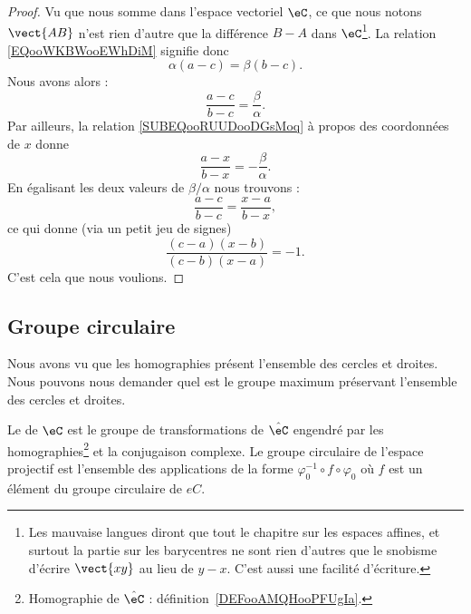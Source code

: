\begin{proof}
	Vu que nous somme dans l'espace vectoriel \( \eC\), ce que nous notons \( \vect{ AB }\) n'est rien d'autre que la différence \( B-A\) dans \( \eC\)\footnote{Les mauvaise langues diront que tout le chapitre sur les espaces affines, et surtout la partie sur les barycentres ne sont rien d'autres que le snobisme d'écrire \( \vect{ xy }\) au lieu de \( y-x\). C'est aussi une facilité d'écriture.}. La relation \eqref{EQooWKBWooEWhDiM} signifie donc
	\begin{equation}
		\alpha(a-c)=\beta(b-c).
	\end{equation}
	Nous avons alors :
	\begin{equation}
		\frac{ a-c }{ b-c }=\frac{ \beta }{ \alpha }.
	\end{equation}
	Par ailleurs, la relation \eqref{SUBEQooRUUDooDGsMoq} à propos des coordonnées de \( x\) donne
	\begin{equation}
		\frac{ a-x }{ b-x }=-\frac{ \beta }{ \alpha }.
	\end{equation}
	En égalisant les deux valeurs de \( \beta/\alpha\) nous trouvons :
	\begin{equation}
		\frac{ a-c }{ b-c }=\frac{ x-a }{ b-x },
	\end{equation}
	ce qui donne (via un petit jeu de signes)
	\begin{equation}
		\frac{ (c-a)(x-b) }{ (c-b)(x-a) }=-1.
	\end{equation}
	C'est cela que nous voulions.
\end{proof}

\subsection{Groupe circulaire}

Nous avons vu que les homographies présent l'ensemble des cercles et droites. Nous pouvons nous demander quel est le groupe maximum préservant l'ensemble des cercles et droites.

\begin{definition}
	Le  de \( \eC\) est le groupe de transformations de \( \hat \eC  \) engendré par les homographies\footnote{Homographie de \( \hat\eC\) : définition~\ref{DEFooAMQHooPFUgIa}.} et la conjugaison complexe. Le groupe circulaire de l'espace projectif est l'ensemble des applications de la forme \( \varphi_0^{-1}\circ f\circ\varphi_0\) où \( f\) est un élément du groupe circulaire de \( eC\).
\end{definition}

